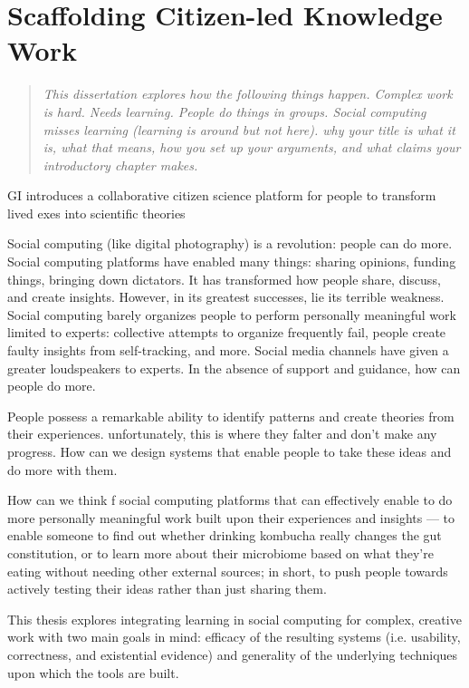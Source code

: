 \chapter{Scaffolding Citizen-led Knowledge Work}

\begin{quote}
\emph{This dissertation explores how the following things happen. Complex work is hard. Needs learning. People do things in groups. Social computing misses learning (learning is around but not here). why your title is what it is, what that means, how you set up your arguments, and what claims your introductory chapter makes.}
\end{quote}
\vspace{0.25in}

GI introduces a collaborative citizen science platform for people to transform lived exes into scientific theories


Social computing (like digital photography) is a revolution: people can do more. Social computing platforms have enabled many things: sharing opinions, funding things, bringing down dictators. It has transformed how people share, discuss, and create insights. However, in its greatest successes, lie its terrible weakness. Social computing barely organizes people to perform personally meaningful work limited to experts: collective attempts to organize frequently fail, people create faulty insights from self-tracking, and more. Social media channels have given a greater loudspeakers to experts. In the absence of support and guidance, how can people do more. 

People possess a remarkable ability to identify patterns and create theories from their experiences. unfortunately, this is where they falter and don’t make any progress. How can we design systems that enable people to take these ideas and do more with them.

How can we think f social computing platforms that can effectively enable to do more personally meaningful work built upon their experiences and insights — to enable someone to find out whether drinking kombucha really changes the gut constitution, or to learn more about their microbiome based on what they’re eating without needing other external sources; in short, to push people towards actively testing their ideas rather than just sharing them.

This thesis explores integrating learning in social computing for complex, creative work with two main goals in mind: efficacy of the resulting systems (i.e. usability, correctness, and existential evidence) and generality of the underlying techniques upon which the tools are built.

